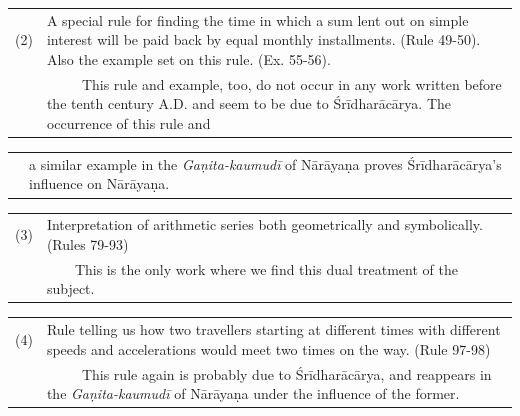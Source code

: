 \documentclass[10pt, openany]{book}
\begin{document}
{\vspace{0.3cm}
\hspace{-8mm} \begin{tabular}{p{} p{}}
(2) & A special rule for finding the time in which a sum lent
{out on simple interest will be paid back by equal monthly}
{installments. (Rule 49-50). Also the example set on this}
{rule. (Ex. 55-56).}\\
& ~~~~~{This rule and example, too, do not occur in any}
{work written before the tenth century A.D. and seem to} 
{be due to Śrīdharācārya. The occurrence of this rule and}
\end{tabular}

\newpage

\englishfont
\hspace{-8mm} \begin{tabular}{p{} p{}}
 & {a similar example in the \textit{Gaṇita-kaumudī} of Nārāyaṇa}
{proves Śrīdharācārya's influence on Nārāyaṇa.}
\end{tabular}

\vspace{0.3cm}
\hspace{-8mm} \begin{tabular}{p{} p{}}
(3) & {Interpretation of arithmetic series both geometrically and symbolically. (Rules 79-93)}\\
& ~~~~{This is the only work where we find this dual treatment of the subject.}
\end{tabular}

\vspace{0.3cm}
\hspace{-8mm} \begin{tabular}{p{} p{}}
(4) & {Rule telling us how two travellers starting at different}
{times with different speeds and accelerations would meet}
{two times on the way. (Rule 97-98)}\\
& ~~~~~{This rule again is probably due to Śrīdharācārya,}
{and reappears in the \textit{Gaṇita-kaumudī} of Nārāyaṇa under}
{the influence of the former.}
\end{tabular}

}
\end{document}
